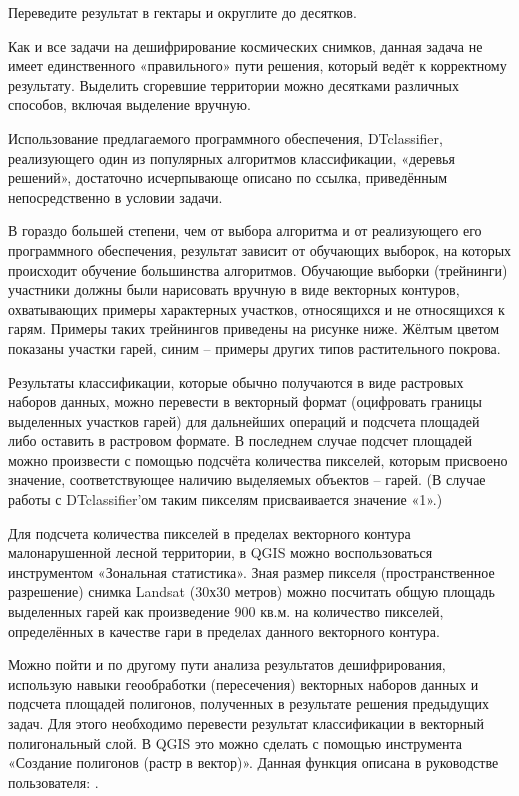Переведите результат в гектары и округлите до десятков.

\explanationSection

Как и все задачи на дешифрирование космических снимков, данная задача не имеет единственного «правильного» пути решения, который ведёт к корректному результату. Выделить сгоревшие территории можно десятками различных способов, включая выделение вручную.

Использование предлагаемого программного обеспечения, DTclassifier, реализующего один из популярных алгоритмов классификации, «деревья решений», достаточно исчерпывающе описано по ссылка, приведённым непосредственно в условии задачи.

В гораздо большей степени, чем от выбора алгоритма и от реализующего его программного обеспечения, результат зависит от обучающих выборок, на которых происходит обучение большинства алгоритмов. Обучающие выборки (трейнинги) участники должны были нарисовать вручную в виде векторных контуров, охватывающих примеры характерных участков, относящихся и не относящихся к гарям. Примеры таких трейнингов приведены на рисунке ниже. Жёлтым цветом показаны участки гарей, синим – примеры других типов растительного покрова.


Результаты классификации, которые обычно получаются в виде растровых наборов данных, можно перевести в векторный формат (оцифровать границы выделенных участков гарей) для дальнейших операций и подсчета площадей либо оставить в растровом формате. В последнем случае подсчет площадей можно произвести с помощью подсчёта количества пикселей, которым присвоено значение, соответствующее наличию выделяемых объектов – гарей. (В случае работы с DTclassifier’ом таким пикселям присваивается значение «1».)

Для подсчета количества пикселей в пределах векторного контура малонарушенной лесной территории, в QGIS можно воспользоваться инструментом «Зональная статистика». Зная размер пикселя (пространственное разрешение) снимка Landsat (30х30 метров) можно посчитать общую площадь выделенных гарей как произведение 900 кв.м. на количество пикселей, определённых в качестве гари в пределах данного векторного контура.

Можно пойти и по другому пути анализа результатов дешифрирования, использую навыки геообработки (пересечения) векторных наборов данных и подсчета площадей полигонов, полученных в результате решения предыдущих задач. Для этого необходимо перевести результат классификации в векторный полигональный слой. В QGIS это можно сделать с помощью инструмента «Создание полигонов (растр в вектор)». Данная функция описана в руководстве пользователя: .

